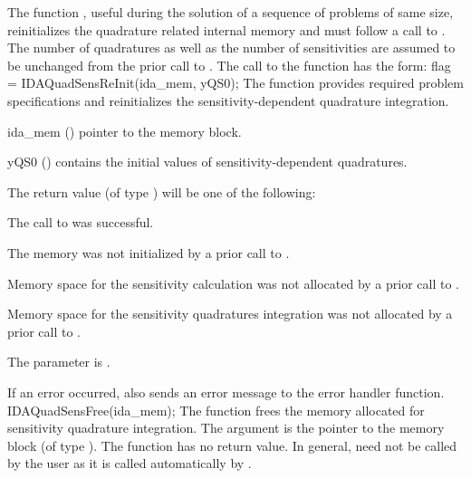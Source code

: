 The function , useful during the solution of a sequence 
of problems of same size, reinitializes the quadrature related internal memory 
and must follow a call to . The number  of 
quadratures as well as the number  of sensitivities are assumed to be 
unchanged from the prior call to .
The call to the  function has the form:
{
  flag = IDAQuadSensReInit(ida\_mem, yQS0);
}
{
  The function  provides required problem specifications 
  and reinitializes the sensitivity-dependent quadrature integration.
}
{
  \begin{args}
  \item[ida\_mem] ()
    pointer to the {\idas} memory block.
  \item[yQS0] ()
    contains the initial values of sensitivity-dependent quadratures.
  \end{args}
}
{
  The return value  (of type ) will be one of the following:
  \begin{args}
  \item[\Id{IDA\_SUCCESS}]
    The call to  was successful.
  \item[\Id{IDA\_MEM\_NULL}] 
    The {\idas} memory was not initialized by a prior call to .
  \item[\Id{IDA\_NO\_SENS}] 
    Memory space for the sensitivity calculation was not allocated by a prior
    call to .
  \item[\Id{IDA\_NO\_QUADSENS}] 
    Memory space for the sensitivity quadratures integration was not allocated by a prior
    call to .
  \item[\Id{IDA\_ILL\_INPUT}] 
    The parameter  is .
  \end{args}
}
{
  If an error occurred,  also sends an error message to the
  error handler function.
}
{
  IDAQuadSensFree(ida\_mem);
}
{
  The function  frees the memory allocated for sensitivity 
  quadrature integration.
}
{
  The argument is the pointer to the {\idas} memory block (of type ).
}
{
  The function  has no return value.
}
{
  In general,  need not be called by the user as it is
  called automatically by .
}


